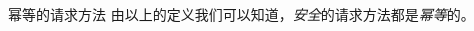 \documentclass[final,table]{beamer}
\begin{document}
\begin{frame}{}
\begin{columns}
\begin{column}{0.9\textwidth}
\begin{columns}
\begin{column}{0.62\textwidth}
\begin{block}{\huge{幂等的请求方法}}
              由以上的定义我们可以知道，\emph{安全}的请求方法都是\emph{幂等}的。
            \end{block}
          \end{column}
        \end{columns}

      \end{column}
      \begin{column}{0.05\textwidth}
      \end{column}
    \end{columns}

  \end{frame}
\end{document}
